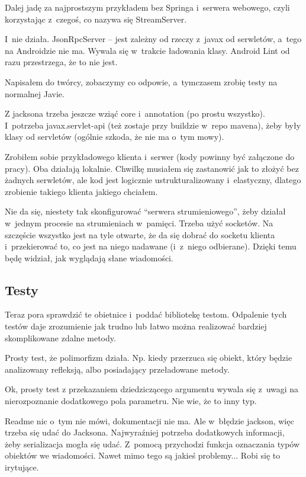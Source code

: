 Dalej jadę za najprostszym przykładem bez Springa i~serwera webowego, czyli korzystając z~czegoś, co nazywa się StreamServer.

I~nie działa. JsonRpcServer -- jest zależny od rzeczy z~javax od serwletów, a~tego na Androidzie nie ma. Wywala się w~trakcie ładowania klasy. Android Lint od razu przestrzega, że to nie jest.

Napisałem do twórcy, zobaczymy co odpowie, a~tymczasem zrobię testy na normalnej Javie.

Z jacksona trzeba jeszcze wziąć core i~annotation (po prostu wszystko). I~potrzeba javax.servlet-api (też zostaje przy buildzie w~repo mavena), żeby były klasy od servletów (ogólnie szkoda, że nie ma o~tym mowy).

Zrobiłem sobie przykładowego klienta i~serwer (kody powinny być załączone do pracy). Oba działają lokalnie. Chwilkę musiałem się zastanowić jak to złożyć bez żadnych serwletów, ale kod jest logicznie ustrukturalizowany i~elastyczny, dlatego zrobienie takiego klienta jakiego chciałem.

Nie da się, niestety tak skonfigurować ``serwera strumieniowego'', żeby działał w~jednym procesie na strumieniach w~pamięci. Trzeba użyć socketów.
Na szczęście wszystko jest na tyle otwarte, że da się dobrać do socketu klienta i~przekierować to, co jest na niego nadawane (i~z~niego odbierane). Dzięki temu będę widział, jak wyglądają słane wiadomości.

\subsection{Testy}
Teraz pora sprawdzić te obietnice i~poddać bibliotekę testom. Odpalenie tych testów daje zrozumienie jak trudno lub łatwo można realizować bardziej skomplikowane zdalne metody.

Prosty test, że polimorfizm działa.  Np. kiedy przerzuca się obiekt, który będzie analizowany refleksją, albo posiadający przeładowane metody.

Ok, prosty test z przekazaniem dziedziczącego argumentu wywala się z~uwagi na nierozpoznanie dodatkowego pola parametru. Nie wie, że to inny typ.

Readme nic o~tym nie mówi, dokumentacji nie ma. Ale w~błędzie jackson, więc trzeba się udać do Jacksona.
Najwyraźniej potrzeba dodatkowych informacji, żeby serializacja mogła się udać. Z~pomocą przychodzi funkcja oznaczania typów obiektów we wiadomości\cite{jackson-polymorphic}.
Nawet mimo tego są jakieś problemy... Robi się to irytujące.

